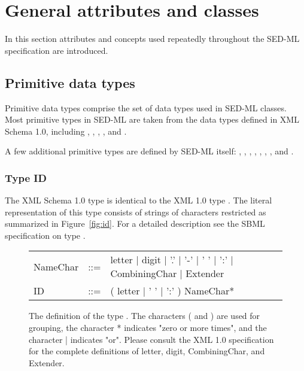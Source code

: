 \pagebreak

\section{General attributes and classes}
In this section attributes and concepts used repeatedly throughout the SED-ML specification are introduced. 


\subsection{Primitive data types}
Primitive data types comprise the set of data types used in SED-ML classes. Most primitive types in SED-ML are taken from the data types defined in XML Schema 1.0, including , , , ,  and . 

A few additional primitive types are defined by SED-ML itself: \hyperref[type:id]{}, \hyperref[type:sid]{}, \hyperref[type:sidref]{}, \hyperref[type:xpath]{}, \hyperref[type:mathml]{}, \hyperref[type:anyURI]{}, \hyperref[type:numlsid]{}, and \hyperref[type:numlsidref]{}.

\subsubsection{Type ID}
\label{type:id}
The XML Schema 1.0 type  is identical to the XML 1.0 type . The literal representation of this type consists of strings of characters restricted as summarized in Figure~\vref{fig:id}. For a detailed description see the SBML specification on type  \citep{HBH+10}.

\begin{figure}[hbt]
  \ttfamily
  \small
  \centering
  \begin{tabular}{lll}
    NameChar & ::= & letter | digit | '.' | '-' | ' ' | ':' | CombiningChar | Extender\\
    ID    & ::= & ( letter | ' ' | ':' ) NameChar*\\
  \end{tabular}
  \vspace*{-1ex}
  \caption{The definition of the type . The characters ( and ) are used for grouping, the character * indicates "zero or more times", and the character | indicates "or". Please consult the XML 1.0 specification for the complete definitions of letter, digit, CombiningChar, and Extender.}
  \label{fig:id}
\end{figure}

